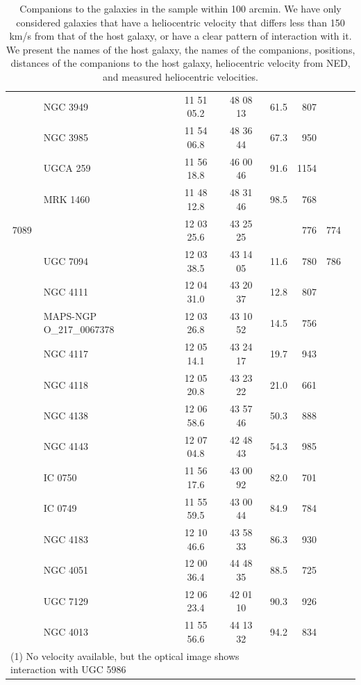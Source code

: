 \documentclass{aa}
\begin{document}
\begin{center}
\begin{table}
\begin{center}
\begin{tabular}{|c|l|c|c|r|r|r|r}
      & NGC 3949                 & 11 51 05.2 & 48 08 13   &   61.5 &   807 & \\
      & NGC 3985                 & 11 54 06.8 & 48 36 44   &   67.3 &   950 & \\
      & UGCA 259                 & 11 56 18.8 & 46 00 46   &   91.6 &   1154 & \\
      & MRK 1460                 & 11 48 12.8 & 48 31 46   &   98.5 &   768 & \\
\hline
7089  &                          & 12 03 25.6 & 43 25 25   &        &   776  &   774\\
      & UGC 7094                 & 12 03 38.5 & 43 14 05   &   11.6 &   780  &   786\\
      & NGC 4111                 & 12 04 31.0 & 43 20 37   &   12.8 &   807 & \\
      & MAPS-NGP O\_217\_0067378   & 12 03 26.8 & 43 10 52   &   14.5 &   756 & \\
      & NGC 4117                 & 12 05 14.1 & 43 24 17   &   19.7 &   943 & \\
      & NGC 4118                 & 12 05 20.8 & 43 23 22   &   21.0 &   661 & \\
      & NGC 4138                 & 12 06 58.6 & 43 57 46   &   50.3 &   888 & \\
      & NGC 4143                 & 12 07 04.8 & 42 48 43   &   54.3 &   985 & \\
      & IC 0750                  & 11 56 17.6 & 43 00 92   &   82.0 &   701 & \\
      & IC 0749                  & 11 55 59.5 & 43 00 44   &   84.9 &   784 & \\
      & NGC 4183                 & 12 10 46.6 & 43 58 33   &   86.3 &   930 & \\
      & NGC 4051                 & 12 00 36.4 & 44 48 35   &   88.5 &   725 & \\
      & UGC 7129                 & 12 06 23.4 & 42 01 10   &   90.3 &   926 & \\
      & NGC 4013                 & 11 55 56.6 & 44 13 32   &   94.2 &   834  &   \\
\hline
\multicolumn{5}{l}{\scriptsize (1) No velocity available, but the optical image shows interaction with UGC 5986}
\end{tabular}
\caption{Companions to the galaxies in the sample within 100
  arcmin. We have only considered galaxies that have a heliocentric
  velocity that differs less than 150 km/s from that of the host
  galaxy, or have a clear pattern of interaction with it. We present
  the names of the host galaxy, the names of the companions,
  positions, distances of the companions to the host galaxy,
  heliocentric velocity from NED, and measured heliocentric
  velocities. }
\label{tab:comp}
\end{center}
\end{table}
\end{center}
\end{document}
